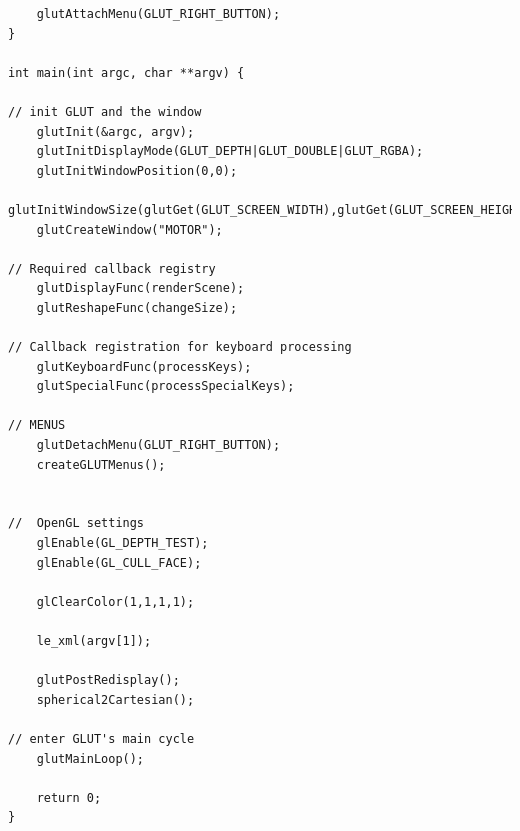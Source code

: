 \documentclass{report}
\begin{document}
\begin{lstlisting}
    glutAttachMenu(GLUT_RIGHT_BUTTON);
}

int main(int argc, char **argv) {

// init GLUT and the window
    glutInit(&argc, argv);
    glutInitDisplayMode(GLUT_DEPTH|GLUT_DOUBLE|GLUT_RGBA);
    glutInitWindowPosition(0,0);
    glutInitWindowSize(glutGet(GLUT_SCREEN_WIDTH),glutGet(GLUT_SCREEN_HEIGHT));
    glutCreateWindow("MOTOR");

// Required callback registry
    glutDisplayFunc(renderScene);
    glutReshapeFunc(changeSize);

// Callback registration for keyboard processing
    glutKeyboardFunc(processKeys);
    glutSpecialFunc(processSpecialKeys);

// MENUS
    glutDetachMenu(GLUT_RIGHT_BUTTON);
    createGLUTMenus();


//  OpenGL settings
    glEnable(GL_DEPTH_TEST);
    glEnable(GL_CULL_FACE);

    glClearColor(1,1,1,1);

    le_xml(argv[1]);

    glutPostRedisplay();
    spherical2Cartesian();

// enter GLUT's main cycle
    glutMainLoop();

    return 0;
}

\end{lstlisting}
\clearpage
\end{document}

